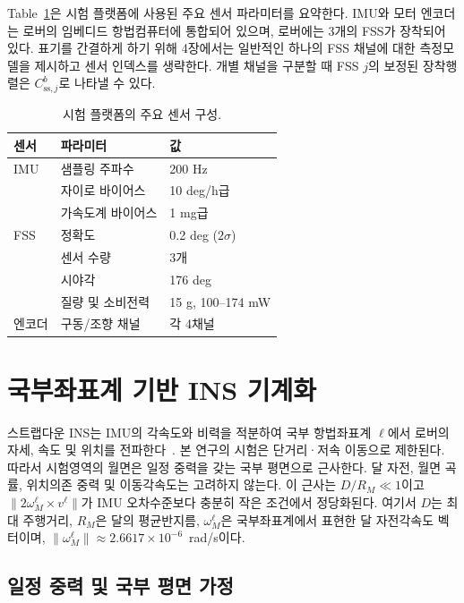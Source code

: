 \documentclass[]{IAC_style}
\begin{document}
Table~\ref{tab:sensors}은 시험 플랫폼에 사용된 주요 센서 파라미터를 요약한다. IMU와 모터 엔코더는 로버의 임베디드 항법컴퓨터에 통합되어 있으며, 로버에는 3개의 FSS가 장착되어 있다. 표기를 간결하게 하기 위해 4장에서는 일반적인 하나의 FSS 채널에 대한 측정모델을 제시하고 센서 인덱스를 생략한다. 개별 채널을 구분할 때 FSS $j$의 보정된 장착행렬은 $C_{\mathrm{ss},j}^b$로 나타낼 수 있다.

\begin{table}[t]
\centering
\caption{시험 플랫폼의 주요 센서 구성.}
\label{tab:sensors}
\scriptsize
\begin{tabularx}{\columnwidth}{p{}p{}X}
\toprule
\textbf{센서} & \textbf{파라미터} & \textbf{값} \\
\midrule
IMU & 샘플링 주파수 & 200 Hz \\
 & 자이로 바이어스 & 10 deg/h급 \\
 & 가속도계 바이어스 & 1 mg급 \\
FSS & 정확도 & 0.2 deg ($2\sigma$) \\
 & 센서 수량 & 3개 \\
 & 시야각 & 176 deg \\
 & 질량 및 소비전력 & 15 g, 100--174 mW \\
엔코더 & 구동/조향 채널 & 각 4채널 \\
\bottomrule
\end{tabularx}
\end{table}

\section{국부좌표계 기반 INS 기계화}

스트랩다운 INS는 IMU의 각속도와 비력을 적분하여 국부 항법좌표계 $\ell$에서 로버의 자세, 속도 및 위치를 전파한다~\cite{titterton2004strapdown,groves2013principles}. 본 연구의 시험은 단거리·저속 이동으로 제한된다. 따라서 시험영역의 월면은 일정 중력을 갖는 국부 평면으로 근사한다. 달 자전, 월면 곡률, 위치의존 중력 및 이동각속도는 고려하지 않는다. 이 근사는 $D/R_M\ll1$이고 $\lVert2\omega_M^\ell\times v^\ell\rVert$가 IMU 오차수준보다 충분히 작은 조건에서 정당화된다. 여기서 $D$는 최대 주행거리, $R_M$은 달의 평균반지름, $\omega_M^\ell$은 국부좌표계에서 표현한 달 자전각속도 벡터이며, $\lVert\omega_M^\ell\rVert\approx2.6617\times10^{-6}$~rad/s이다.

\subsection{일정 중력 및 국부 평면 가정}
\end{document}
